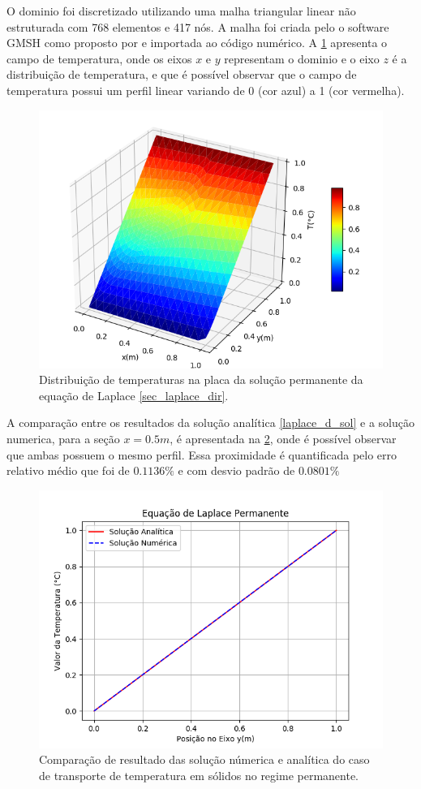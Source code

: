 O dominio foi discretizado utilizando uma malha triangular linear não estruturada com 768 elementos e 417 nós.
A malha foi criada pelo o software GMSH como proposto por \cite{gmsh} e importada ao código numérico.
A \ref{laplace_d_3d} apresenta o campo de temperatura, onde os eixos $x$ e $y$ representam o dominio e o eixo $z$ é a distribuição de temperatura, e que é possível observar que o campo de temperatura possui um perfil linear variando de 0 (cor azul) a 1 (cor vermelha).
\begin{figure}[H]
    \centering
    \includegraphics[width=.7\linewidth]{figures/laplace_dirichlet_permanent_3d.png}
    \caption{Distribuição de temperaturas na placa da solução permanente da equação de Laplace \ref{sec_laplace_dir}.}
    \label{laplace_d_3d}
\end{figure}

A comparação entre os resultados da solução analítica \eqref{laplace_d_sol} e a solução numerica, para a seção $x=0.5m$, é apresentada na \ref{laplace_d_perm_comp}, onde é possível observar que ambas possuem o mesmo perfil.
Essa proximidade é quantificada pelo erro relativo médio que foi de $0.1136\%$ e com desvio padrão de $0.0801\%$
\begin{figure}[H]
    \centering
    \includegraphics[width=.7\linewidth]{figures/laplace_dirichlet_permanent_comparison.png}
    \caption{Comparação de resultado das solução númerica e analítica do caso de transporte de temperatura em sólidos no regime permanente.}
    \label{laplace_d_perm_comp}
\end{figure}

